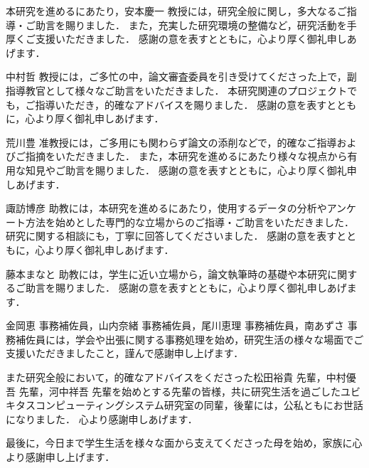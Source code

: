 \acknowledgements
本研究を進めるにあたり，安本慶一 教授には，研究全般に関し，多大なるご指導・ご助言を賜りました．
また，充実した研究環境の整備など，研究活動を手厚くご支援いただきました．
感謝の意を表すとともに，心より厚く御礼申しあげます．

中村哲 教授には，ご多忙の中，論文審査委員を引き受けてくださった上で，副指導教官として様々なご助言をいただきました．
本研究関連のプロジェクトでも，ご指導いただき，的確なアドバイスを賜りました．
感謝の意を表すとともに，心より厚く御礼申しあげます．

荒川豊 准教授には，ご多用にも関わらず論文の添削などで，的確なご指導およびご指摘をいただきました．
また，本研究を進めるにあたり様々な視点から有用な知見やご助言を賜りました．
感謝の意を表すとともに，心より厚く御礼申しあげます．

諏訪博彦 助教には，本研究を進めるにあたり，使用するデータの分析やアンケート方法を始めとした専門的な立場からのご指導・ご助言をいただきました．
研究に関する相談にも，丁寧に回答してくださいました．
感謝の意を表すとともに，心より厚く御礼申しあげます．

藤本まなと 助教には，学生に近い立場から，論文執筆時の基礎や本研究に関するご助言を賜りました．
感謝の意を表すとともに，心より厚く御礼申しあげます．

金岡恵 事務補佐員，山内奈緒 事務補佐員，尾川恵理 事務補佐員，南あずさ 事務補佐員には，学会や出張に関する事務処理を始め，研究生活の様々な場面でご支援いただきましたこと，謹んで感謝申し上げます．

また研究全般において，的確なアドバイスをくださった松田裕貴 先輩，中村優吾 先輩，河中祥吾 先輩を始めとする先輩の皆様，共に研究生活を過ごしたユビキタスコンピューティングシステム研究室の同輩，後輩には，公私ともにお世話になりました．
心より感謝申しあげます．

最後に，今日まで学生生活を様々な面から支えてくださった母を始め，家族に心より感謝申し上げます．